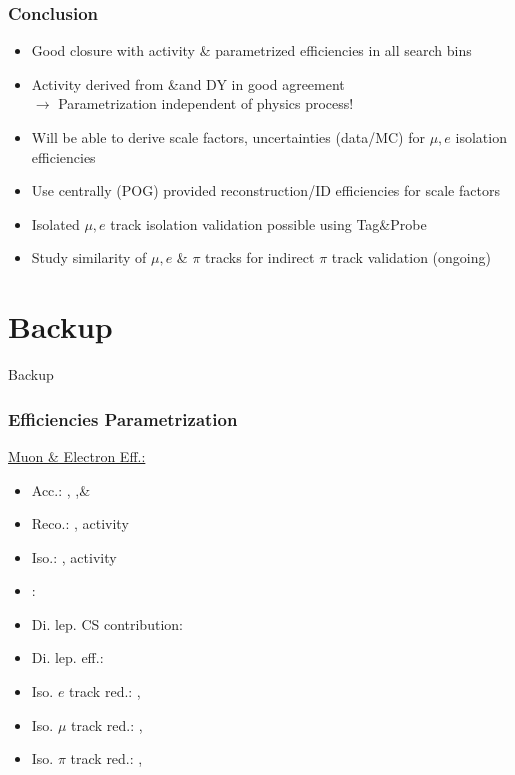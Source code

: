 \documentclass{beamer}
\begin{document}
\begin{frame}
 \frametitle{Conclusion}
 
 \begin{itemize}
 \item Good closure with activity \& \pt parametrized efficiencies in all search bins
 \item Activity derived from \ttbar\&\wpj and DY in good agreement\\$\rightarrow$ Parametrization independent of physics process!
 \item Will be able to derive scale factors, uncertainties (data/MC) for $\mu,e$ isolation efficiencies
 \item Use centrally (POG) provided reconstruction/ID efficiencies for scale factors
 \item Isolated $\mu,e$ track isolation validation possible using Tag\&Probe
 \item Study similarity of $\mu,e$ \& $\pi$ tracks for indirect $\pi$ track validation (ongoing)


 \end{itemize}

\end{frame}



\section{Backup}
\begin{frame}
 \begin{block}{}
 \centering
 \Large Backup
 \end{block}
\end{frame}



\begin{frame}
 \frametitle{Efficiencies Parametrization}

 \underline{Muon \& Electron Eff.:}
 \begin{itemize}
  \item Acc.: \HT, \MHT ,\& \NJets
  \item Reco.: \pt, activity
  \item Iso.: \pt, activity
  \item \mt: \NJets
  \item Di. lep. CS contribution: \NJets
  \item Di. lep. eff.: \NJets
  \item Iso. $e$ track red.: \BTags, \NJets
  \item Iso. $\mu$ track red.: \BTags, \NJets
  \item Iso. $\pi$ track red.: \BTags, \NJets
 \end{itemize}
\end{frame}
\end{document}
